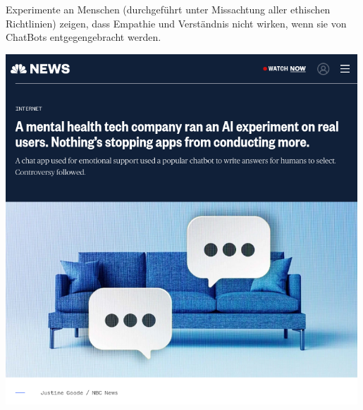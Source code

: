 \documentclass[aspectratio=169,usenames,dvipsnames]{beamer}
\begin{document}
\begin{frame}
\begin{minipage}{0.4\textwidth}
\large Experimente an Menschen (durchgeführt unter Missachtung aller ethischen Richtlinien) zeigen,
dass Empathie und Verständnis nicht wirken, wenn sie von ChatBots entgegengebracht werden.
\end{minipage}\hfill\begin{minipage}{0.48\textwidth}
\begin{center}
\includegraphics[width=0.99\textwidth, keepaspectratio]{images/chatgpt_mental_health} 
\end{center}
\end{minipage}
\end{frame}
\end{document}
